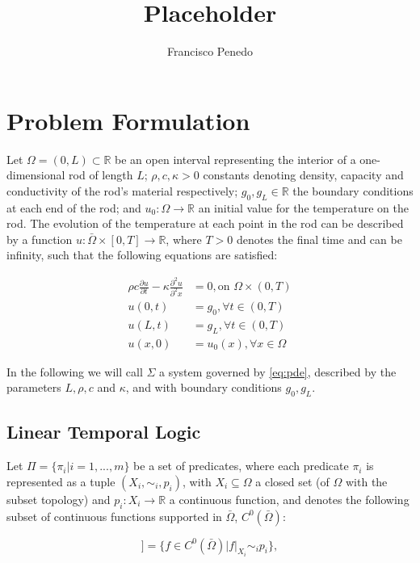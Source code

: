 \documentclass{article}
\title{Placeholder}
\author{Francisco Penedo}
\newcommand*{\R}{\mathbb{R}}
\newcommand*{\psat}[1]{[[#1]]}
\begin{document}
\section{Problem Formulation}
\label{sec:problem_formulation}

Let $\Omega = (0, L) \subset \R$ be an open interval representing the interior
of a one-dimensional rod of length $L$; $\rho, c, \kappa > 0$ 
constants denoting density, capacity and conductivity of the rod's material respectively;
$g_0, g_L \in \R$ the boundary conditions at each end of the rod; and $u_0 :
\Omega \rightarrow \R$ an initial value for the temperature on the rod. 
The evolution of the temperature at
each point in the rod can be described by a function $u : \bar \Omega \times [0,
T] \rightarrow \R$, where $T > 0$ denotes the final time and can be infinity, 
such that the following equations are satisfied:

\begin{equation}\label{eq:pde}
    \begin{aligned}
        \rho c \frac{\partial u}{\partial t} - \kappa \frac{\partial^2
        u}{\partial^2 x} &= 0, \text{on } \Omega \times (0, T) \\
        u(0, t) &= g_0, \forall t \in (0, T) \\
        u(L, t) &= g_L, \forall t \in (0, T) \\
        u(x, 0) &= u_0(x), \forall x \in \Omega
    \end{aligned}
\end{equation}

In the following we will call $\Sigma$ a system governed by \eqref{eq:pde},
described by the parameters $L, \rho, c$ and $\kappa$, and with boundary
conditions $g_0, g_L$.

\subsection{Linear Temporal Logic}
\label{sub:linear_temporal_logic}

Let $\Pi = \{\pi_i | i = 1, ..., m\}$ be a set of predicates, where each
predicate $\pi_i$ is represented as a tuple $(X_i, \sim_i, p_i)$, with $X_i \subseteq
\Omega$ a closed set (of $\Omega$ with the subset topology) and $p_i : X_i
\rightarrow \R$ a continuous function, and denotes the following subset of
continuous functions supported in $\bar\Omega$, $C^0(\bar\Omega)$:

\begin{equation}
    \psat{\pi_i} = \{ f \in C^0(\bar\Omega) | \left.f\right|_{X_i} \sim_i p_i \},
\end{equation}
\end{document}
